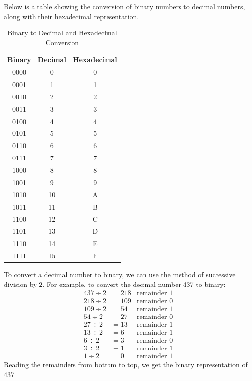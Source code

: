 \documentclass[11pt]{report}
\begin{document}
\begin{example}
    Below is a table showing the conversion of binary numbers to decimal numbers, along with their hexadecimal representation.
    \begin{table}[h!]
        \centering
        \begin{tabular}{|c|c|c|}
            \hline
            Binary & Decimal & Hexadecimal \\
            \hline
            0000 & 0 & 0 \\
            0001 & 1 & 1 \\
            0010 & 2 & 2 \\
            0011 & 3 & 3 \\
            0100 & 4 & 4 \\
            0101 & 5 & 5 \\
            0110 & 6 & 6 \\
            0111 & 7 & 7 \\
            1000 & 8 & 8 \\
            1001 & 9 & 9 \\
            1010 & 10 & A \\
            1011 & 11 & B \\
            1100 & 12 & C \\
            1101 & 13 & D \\
            1110 & 14 & E \\
            1111 & 15 & F \\
            \hline
        \end{tabular}
        \caption{Binary to Decimal and Hexadecimal Conversion}
    \end{table}
    
\end{example}
\begin{example}
    To convert a decimal number to binary, we can use the method of successive division by 2. For example, to convert the decimal number 437 to binary:
    \begin{align*}
        437 \div 2 &= 218 & \text{remainder 1} \\
        218 \div 2 &= 109 & \text{remainder 0} \\
        109 \div 2 &= 54 & \text{remainder 1} \\
        54 \div 2 &= 27 & \text{remainder 0} \\
        27 \div 2 &= 13 & \text{remainder 1} \\
        13 \div 2 &= 6 & \text{remainder 1} \\
        6 \div 2 &= 3 & \text{remainder 0} \\
        3 \div 2 &= 1 & \text{remainder 1} \\
        1 \div 2 &= 0 & \text{remainder 1}
    \end{align*}
    Reading the remainders from bottom to top, we get the binary representation of 437
\end{example}
\end{document}
